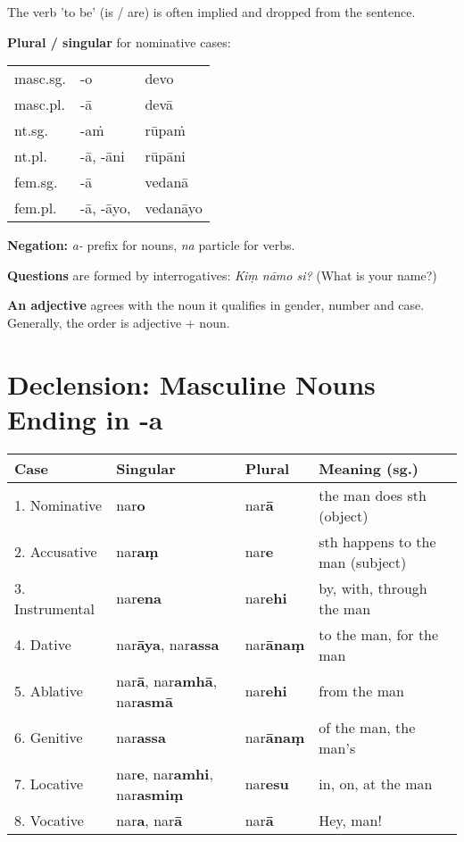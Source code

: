 \documentclass[11pt,oneside]{memoir}
\begin{document}
The verb 'to be' (is / are) is often implied and dropped from the sentence.

\begin{multicols}{2}

\textbf{Plural / singular} for nominative cases:

\begin{center}
\begin{tabular}{lll}
masc.sg. & -o & devo\\[0pt]
masc.pl. & -ā & devā\\[0pt]
\hline
nt.sg. & -aṁ & rūpaṁ\\[0pt]
nt.pl. & -ā, -āni & rūpāni\\[0pt]
\hline
fem.sg. & -ā & vedanā\\[0pt]
fem.pl. & -ā, -āyo, & vedanāyo\\[0pt]
\end{tabular}
\end{center}

\columnbreak

\textbf{Negation:} \emph{a-} prefix for nouns, \emph{na} particle for verbs.

\textbf{Questions} are formed by interrogatives: \emph{Kiṃ nāmo si?} (What is your name?)

\textbf{An adjective} agrees with the noun it qualifies in gender, number and case. Generally, the order is adjective + noun.

\end{multicols}

\section{Declension: Masculine Nouns Ending in -a}
\label{sec:orgb7a3301}

\begin{center}
\begin{tabular}{llll}
Case & Singular & Plural & Meaning (sg.)\\[0pt]
\hline
1. Nominative & nar\textbf{o} & nar\textbf{ā} & the man does sth (object)\\[0pt]
2. Accusative & nar\textbf{aṃ} & nar\textbf{e} & sth happens to the man (subject)\\[0pt]
3. Instrumental & nar\textbf{ena} & nar\textbf{ehi} & by, with, through the man\\[0pt]
4. Dative & nar\textbf{āya}, nar\textbf{assa} & nar\textbf{ānaṃ} & to the man, for the man\\[0pt]
5. Ablative & nar\textbf{ā}, nar\textbf{amhā}, nar\textbf{asmā} & nar\textbf{ehi} & from the man\\[0pt]
6. Genitive & nar\textbf{assa} & nar\textbf{ānaṃ} & of the man, the man's\\[0pt]
7. Locative & nar\textbf{e}, nar\textbf{amhi}, nar\textbf{asmiṃ} & nar\textbf{esu} & in, on, at the man\\[0pt]
8. Vocative & nar\textbf{a}, nar\textbf{ā} & nar\textbf{ā} & Hey, man!\\[0pt]
\end{tabular}
\end{center}
\end{document}
